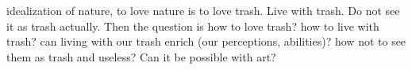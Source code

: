 


idealization of nature, to love nature is to love trash. Live with trash. Do not see it as trash actually. Then the question is how to love trash? how to live with trash? can living with our trash enrich (our perceptions, abilities)? how not to see them as trash and useless? Can it be possible with art?

